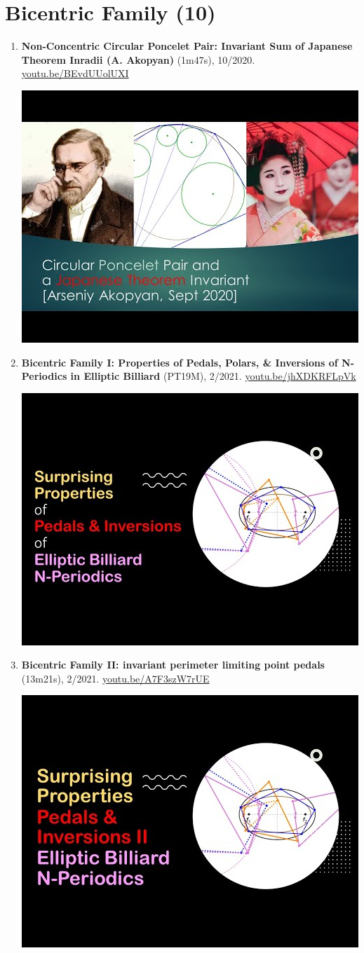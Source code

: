 \documentclass[12pt]{article}
\begin{document}
\section{Bicentric Family (10)}

\begin{enumerate}[resume]
\item \textbf{Non-Concentric Circular Poncelet Pair: Invariant Sum of Japanese Theorem Inradii (A. Akopyan)} (1m47s), 10/2020. \href{https://youtu.be/BEvdUUolUXI}{\url{youtu.be/BEvdUUolUXI}}
\begin{center}\includegraphics[width=.5\textwidth]{pics/BEvdUUolUXI.jpg}\end{center}
% 
\item \textbf{Bicentric Family I: Properties of Pedals, Polars, \& Inversions of N-Periodics in Elliptic Billiard} (PT19M), 2/2021. \href{https://youtu.be/jhXDKRFLpVk}{\url{youtu.be/jhXDKRFLpVk}}
\begin{center}\includegraphics[width=.5\textwidth]{pics/jhXDKRFLpVk.jpg}\end{center}
% 
\item \textbf{Bicentric Family II: invariant perimeter limiting point pedals} (13m21s), 2/2021. \href{https://youtu.be/A7F3szW7rUE}{\url{youtu.be/A7F3szW7rUE}}
\begin{center}\includegraphics[width=.5\textwidth]{pics/A7F3szW7rUE.jpg}\end{center}

\end{enumerate}
\end{document}
